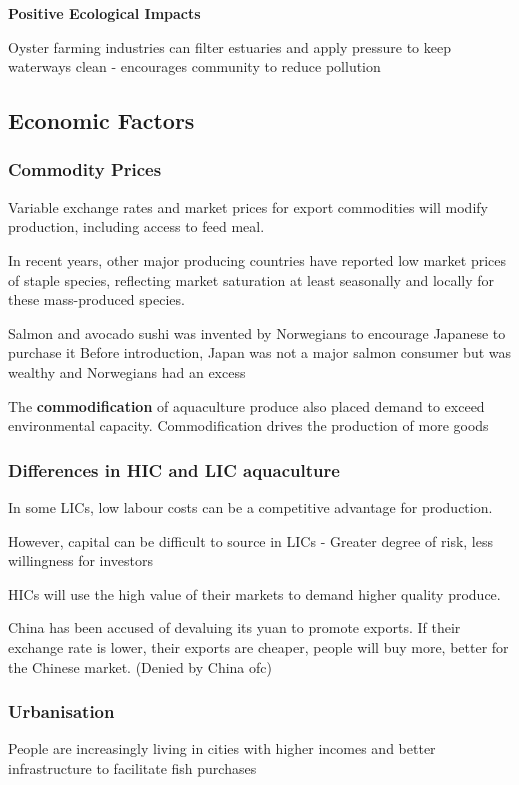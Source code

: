 			\textbf{Positive Ecological Impacts}

			Oyster farming industries can filter estuaries and apply pressure to keep waterways clean - encourages community to reduce pollution

		\subsection{Economic Factors}
			\subsubsection{Commodity Prices}
				Variable exchange rates and market prices for export commodities will modify production, including access to feed meal.

				In recent years, other major producing countries have reported low market prices of staple species, reflecting market saturation at least seasonally and locally for these mass-produced species.
				
				Salmon and avocado sushi was invented by Norwegians to encourage Japanese to purchase it
				Before introduction, Japan was not a major salmon consumer but was wealthy and Norwegians had an excess

				The \textbf{commodification} of aquaculture produce also placed demand to exceed environmental capacity. Commodification drives the production of more goods

			\subsubsection{Differences in HIC and LIC aquaculture}
				In some LICs, low labour costs can be a competitive advantage for production. 

				However, capital can be difficult to source in LICs - Greater degree of risk, less willingness for investors

				HICs will use the high value of their markets to demand higher quality produce.

				China has been accused of devaluing its yuan to promote exports. If their exchange rate is lower, their exports are cheaper, people will buy more, better for the Chinese market. (Denied by China ofc)
			
			\subsubsection{Urbanisation}
				People are increasingly living in cities with higher incomes and better infrastructure to facilitate fish purchases

